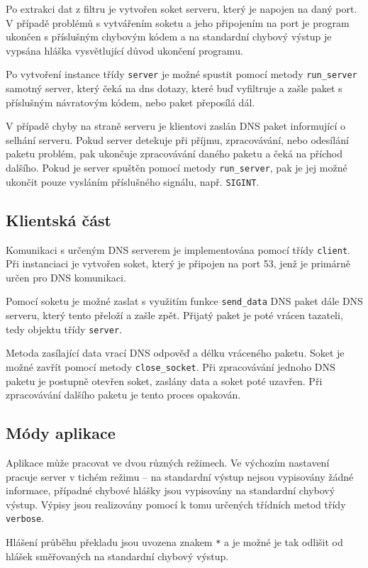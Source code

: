 \documentclass[a4paper, 11pt]{article}
\begin{document}
	Po extrakci dat z filtru je vytvořen soket serveru, který je napojen na daný port. V případě problémů s vytvářením soketu a jeho připojením na port je program ukončen s příslušným chybovým kódem a na standardní chybový výstup je vypsána hláška vysvětlující důvod ukončení programu.

	Po vytvoření instance třídy \texttt{server} je možné spustit pomocí metody \texttt{run\_server} samotný server, který čeká na dns dotazy, které buď vyfiltruje a zašle paket s příslušným návratovým kódem, nebo paket přeposílá dál. 
	
	V případě chyby na straně serveru je klientovi zaslán DNS paket informující o selhání serveru. Pokud server detekuje při příjmu, zpracovávání, nebo odesílání paketu problém, pak ukončuje zpracovávání daného paketu a čeká na příchod dalšího. Pokud je server spuštěn pomocí metody \texttt{run\_server}, pak je jej možné ukončit pouze vysláním příslušného signálu, např. \texttt{SIGINT}.
	
	\subsection{Klientská část}	
	Komunikaci s určeným DNS serverem je implementována pomocí třídy \texttt{client}. Při instanciaci je vytvořen soket, který je připojen na port 53, jenž je primárně určen pro DNS komunikaci. 
	
	Pomocí soketu je možné zaslat s využitím funkce \texttt{send\_data} DNS paket dále DNS serveru, který tento přeloží a zašle zpět. Přijatý paket je poté vrácen tazateli, tedy objektu třídy \texttt{server}. 
	
	Metoda zasílající data vrací DNS odpověď a délku vráceného paketu. Soket je možné zavřít pomocí metody \texttt{close\_socket}. Při zpracovávání jednoho DNS paketu je postupně otevřen soket, zaslány data a soket poté uzavřen. Při zpracovávání dalšího paketu je tento proces opakován.
	
	\subsection{Módy aplikace}
	Aplikace může pracovat ve dvou různých režimech. Ve výchozím nastavení pracuje server v tichém režimu -- na standardní výstup nejsou vypisovány žádné informace, případné chybové hlášky jsou vypisovány na standardní chybový výstup. Výpisy jsou realizovány pomocí k tomu určených třídních metod třídy \texttt{verbose}. 
	
	Hlášení průběhu překladu jsou uvozena znakem \texttt{*} a je možné je tak odlišit od hlášek směřovaných na standardní chybový výstup.
	
\end{document}
